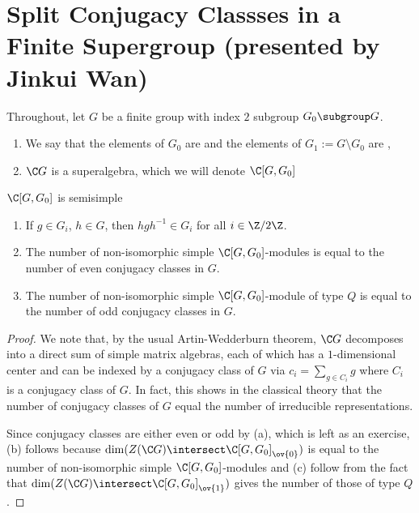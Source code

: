 \documentclass[11pt,leqno,oneside]{amsbook}
\numberwithin{thm}{section}
\begin{document}
\section{Split Conjugacy Classses in a Finite Supergroup (presented by
  Jinkui Wan)}
Throughout, let \(G\) be a finite group with index \(2\) subgroup
\(G_0 \subgroup G\).
\begin{defn}
  \begin{enumerate}
  \item We say that the elements of \(G_0\) are  and the
  elements of \(G_1 := G \setminus G_0\) are ,
  \item \(\C G\) is a superalgebra, which we will denote \(\C[G,G_0]\)
  \end{enumerate}
\end{defn}
\begin{thm}
  \(\C[G,G_0]\) is semisimple
\end{thm}
\begin{prop}
  \begin{enumerate}
  \item If \(g \in G_i\), \(h \in G\), then \(hgh^{-1} \in G_i\) for
    all \(i \in \Z/2\Z\).
  \item The number of non-isomorphic simple \(\C[G,G_0]\)-modules is
    equal to the number of even conjugacy classes in \(G\).
  \item The number of non-isomorphic simple \(\C[G,G_0]\)-module of
    type \(Q\) is equal to the number of odd conjugacy classes in \(G\).
  \end{enumerate}
\end{prop}
\begin{proof}
  We note that, by the usual Artin-Wedderburn theorem, \(\C G\)
  decomposes into a direct sum of simple matrix algebras, each of
  which has a \(1\)-dimensional center and can be indexed by a
  conjugacy class of \(G\) via \(c_i = \sum_{g \in C_i} g\) where
  \(C_i\) is a conjugacy class of \(G\). In fact, this shows in the
  classical theory that the number of conjugacy classes of \(G\) equal
  the number of irreducible representations.
  
  Since conjugacy classes are either even or odd by (a), which is left
  as an exercise, (b) follows
  because \(\dim (Z(\C G) \intersect 
  \C[G,G_0]_{\ov{0}})\) is equal to the number of non-isomorphic
  simple \(\C[G,G_0]\)-modules and (c) follow from the fact that \(\dim(Z(\C G)
  \intersect \C[G,G_0]_{\ov{1}})\) gives the number of those of type \(Q\).
\end{proof}
\end{document}
